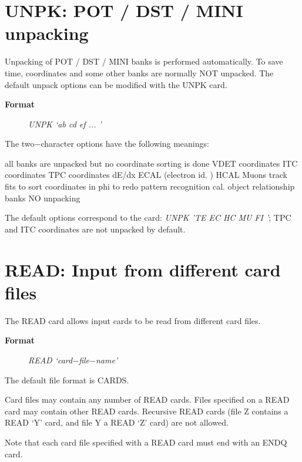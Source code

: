 \section{\label{sec-DCUNPK}UNPK: POT / DST / MINI unpacking}
\par
\par Unpacking of POT / DST / MINI banks is performed automatically. To save
time, coordinates and some other banks are normally NOT unpacked.
The
default unpack options can be modified with the UNPK card.
\begin{description}\item[\bf{Format
}]{\it UNPK `ab cd ef ... '}\end{description}
The two$-$character options have the following meanings:
\begin{indentlist}{ 2.50cm}{ 2.75cm}
all banks are unpacked but no
coordinate sorting is done
 VDET coordinates
 ITC coordinates
 TPC coordinates
 dE/dx
 ECAL (electron id. )
 HCAL
 Muons
 track fits
 to sort coordinates in phi to redo pattern recognition
 cal. object relationship banks
 NO unpacking
\end{indentlist}
The default options correspond to the card:
{\it UNPK 'TE EC HC MU FI '}; TPC and ITC coordinates are not
unpacked by default.
 
\par
\section{\label{sec-DCREAD}READ: Input from different card files}
\par
\par The READ card allows input cards to be read from different
card
files.
\begin{description}\item[\bf{Format
}]{\it READ `card$-$file$-$name'}\end{description}
The default file format is CARDS.
\par
Card files may contain any number of READ cards. Files specified on
a
READ card may contain other READ cards. Recursive READ cards (file
Z
contains a READ `Y' card, and file Y a READ `Z' card) are not allowed.
\par
Note that each card file specified with a READ card must end with
an ENDQ card.
\par

